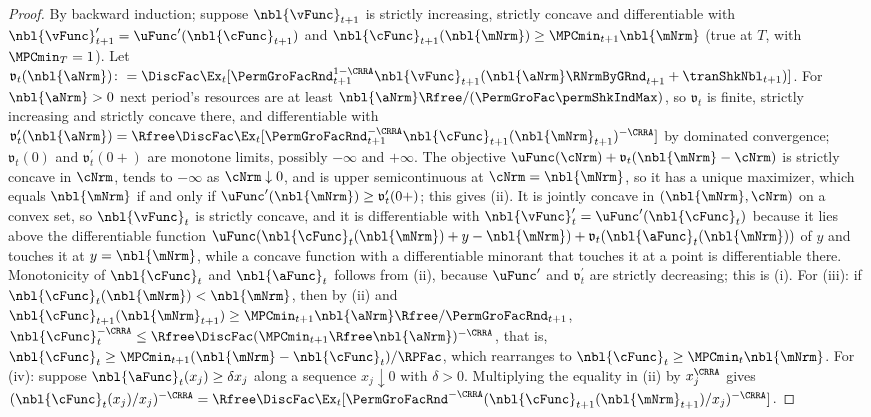 \documentclass[\econtexRoot/BufferStockTheory]{subfiles}
\begin{document}
\begin{proof}
By backward induction; suppose $\nbl{\vFunc}_{t+1}$ is strictly increasing, strictly concave and differentiable with $\nbl{\vFunc}_{t+1}^{\prime}=\uFunc^{\prime}(\nbl{\cFunc}_{t+1})$ and $\nbl{\cFunc}_{t+1}(\nbl{\mNrm})\geq\MPCmin_{t+1}\nbl{\mNrm}$ (true at $T$, with $\MPCmin_{T}=1$).
Let $\mathfrak{v}_{t}(\nbl{\aNrm})\colon=\DiscFac\Ex_{t}[\PermGroFacRnd_{t+1}^{1-\CRRA}\nbl{\vFunc}_{t+1}(\nbl{\aNrm}\RNrmByGRnd_{t+1}+\tranShkNbl_{t+1})]$.
For $\nbl{\aNrm}>0$ next period's resources are at least $\nbl{\aNrm}\Rfree/(\PermGroFac\permShkIndMax)$, so $\mathfrak{v}_{t}$ is finite, strictly increasing and strictly concave there, and differentiable with $\mathfrak{v}_{t}^{\prime}(\nbl{\aNrm})=\Rfree\DiscFac\Ex_{t}[\PermGroFacRnd_{t+1}^{-\CRRA}\nbl{\cFunc}_{t+1}(\nbl{\mNrm}_{t+1})^{-\CRRA}]$ by dominated convergence; $\mathfrak{v}_{t}(0)$ and $\mathfrak{v}_{t}^{\prime}(0+)$ are monotone limits, possibly $-\infty$ and $+\infty$.
The objective $\uFunc(\cNrm)+\mathfrak{v}_{t}(\nbl{\mNrm}-\cNrm)$ is strictly concave in $\cNrm$, tends to $-\infty$ as $\cNrm\downarrow 0$, and is upper semicontinuous at $\cNrm=\nbl{\mNrm}$, so it has a unique maximizer, which equals $\nbl{\mNrm}$ if and only if $\uFunc^{\prime}(\nbl{\mNrm})\geq\mathfrak{v}_{t}^{\prime}(0+)$; this gives (ii).
It is jointly concave in $(\nbl{\mNrm},\cNrm)$ on a convex set, so $\nbl{\vFunc}_{t}$ is strictly concave, and it is differentiable with $\nbl{\vFunc}_{t}^{\prime}=\uFunc^{\prime}(\nbl{\cFunc}_{t})$ because it lies above the differentiable function $\uFunc(\nbl{\cFunc}_{t}(\nbl{\mNrm})+y-\nbl{\mNrm})+\mathfrak{v}_{t}(\nbl{\aFunc}_{t}(\nbl{\mNrm}))$ of $y$ and touches it at $y=\nbl{\mNrm}$, while a concave function with a differentiable minorant that touches it at a point is differentiable there.
Monotonicity of $\nbl{\cFunc}_{t}$ and $\nbl{\aFunc}_{t}$ follows from (ii), because $\uFunc^{\prime}$ and $\mathfrak{v}_{t}^{\prime}$ are strictly decreasing; this is (i).
For (iii): if $\nbl{\cFunc}_{t}(\nbl{\mNrm})<\nbl{\mNrm}$, then by (ii) and $\nbl{\cFunc}_{t+1}(\nbl{\mNrm}_{t+1})\geq\MPCmin_{t+1}\nbl{\aNrm}\Rfree/\PermGroFacRnd_{t+1}$, $\nbl{\cFunc}_{t}^{-\CRRA}\leq\Rfree\DiscFac(\MPCmin_{t+1}\Rfree\nbl{\aNrm})^{-\CRRA}$, that is, $\nbl{\cFunc}_{t}\geq\MPCmin_{t+1}(\nbl{\mNrm}-\nbl{\cFunc}_{t})/\RPFac$, which rearranges to $\nbl{\cFunc}_{t}\geq\MPCmin_{t}\nbl{\mNrm}$.
For (iv): suppose $\nbl{\aFunc}_{t}(x_{j})\geq\delta x_{j}$ along a sequence $x_{j}\downarrow 0$ with $\delta>0$.
Multiplying the equality in (ii) by $x_{j}^{\CRRA}$ gives $(\nbl{\cFunc}_{t}(x_{j})/x_{j})^{-\CRRA}=\Rfree\DiscFac\Ex_{t}[\PermGroFacRnd^{-\CRRA}(\nbl{\cFunc}_{t+1}(\nbl{\mNrm}_{t+1})/x_{j})^{-\CRRA}]$.

\end{proof}
\end{document}
